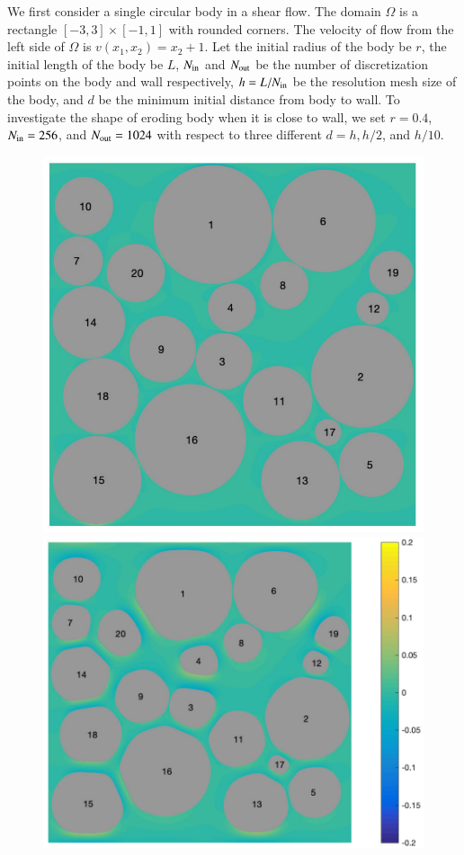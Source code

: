 \documentclass[preprint, 10pt]{elsarticle}
\begin{document}
{\color{red} We first consider a single circular body in a shear flow. 
The domain $\Omega$ is a rectangle $[-3,3]\times[-1,1]$ with rounded corners. 
The velocity of flow from the left side of $\Omega$ is $v(x_1,x_2)=x_2+1$. 
Let the initial radius of the body be $r$, 
the initial length of the body be $L$, $N_{\mathrm{in}}$ and 
$N_{\mathrm{out}}$ be the number of discretization points 
on the body and wall respectively, 
$h=L/N_{\mathrm{in}}$ be the resolution mesh size of the body, 
and $d$ be the minimum initial distance from body to wall. 
To investigate the shape of eroding body when it is close to wall, 
we set $r=0.4$, $N_{\mathrm{in}}=256$, and $N_{\mathrm{out}}=1024$ 
with respect to three different $d=h, h/2$, and $ h/10$. 

}

\begin{figure}[H]
\begin{center}
\includegraphics[width = 0.42 \textwidth]{./figs/20b_dense1}
\includegraphics[width = 0.507 \textwidth]{./figs/20b_dense101}\\


\end{center}
\end{figure}
\end{document}
